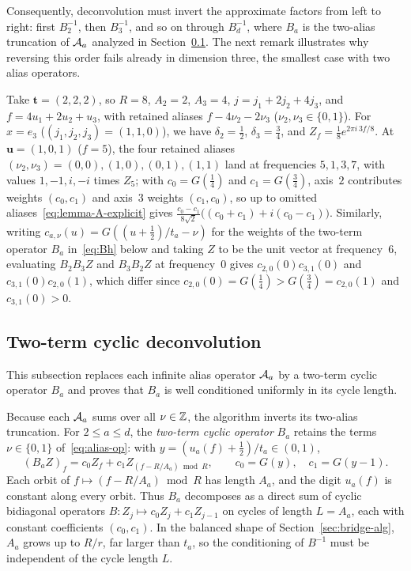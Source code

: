 Consequently, deconvolution must invert the approximate factors from left to right: first $B_2^{-1}$, then $B_3^{-1}$,
and so on through $B_d^{-1}$, where $B_a$ is the two-alias truncation of $\mathcal{A}_a$ analyzed in
Section~\ref{sec:bridge-B}. The next remark illustrates why reversing this order fails already in dimension three, the
smallest case with two alias operators.

\begin{remark}\label{rem:bridge-d3}
Take $\mathbf t=(2,2,2)$, so $R=8$, $A_2=2$, $A_3=4$, $j=j_1+2j_2+4j_3$, and $f=4u_1+2u_2+u_3$, with retained aliases
$f-4\nu_2-2\nu_3$ ($\nu_2,\nu_3\in\{0,1\}$). For $x=e_3$ ($(j_1,j_2,j_3)=(1,1,0)$), we have $\delta_2=\tfrac12$,
$\delta_3=\tfrac34$, and $Z_f=\tfrac18 e^{2\pi i\,3f/8}$. At $\mathbf u=(1,0,1)$ ($f=5$), the four retained aliases
$(\nu_2,\nu_3)=(0,0),(1,0),(0,1),(1,1)$ land at frequencies $5,1,3,7$, with values $1,-1,i,-i$ times $Z_5$; with
$c_0=G(\tfrac14)$ and $c_1=G(\tfrac34)$, axis~$2$ contributes weights $(c_0,c_1)$ and axis~$3$ weights $(c_1,c_0)$, so
up to omitted aliases~\eqref{eq:lemma-A-explicit} gives
$\frac{c_0-c_1}{8\sqrt2}\bigl((c_0+c_1)+i(c_0-c_1)\bigr)$.
Similarly, writing $c_{a,\nu}(u)=G((u+\tfrac12)/t_a-\nu)$ for the weights of the two-term operator $B_a$
in~\eqref{eq:Bh} below and taking $Z$ to be the unit vector at frequency~$6$, evaluating $B_2 B_3 Z$ and $B_3 B_2 Z$ at
frequency~$0$ gives $c_{2,0}(0)c_{3,1}(0)$ and $c_{3,1}(0)c_{2,0}(1)$, which differ since
$c_{2,0}(0)=G(\tfrac14)>G(\tfrac34)=c_{2,0}(1)$ and $c_{3,1}(0)>0$.
\end{remark}

\subsection{Two-term cyclic deconvolution}\label{sec:bridge-B}

This subsection replaces each infinite alias operator $\mathcal{A}_a$ by a two-term cyclic operator $B_a$ and proves that $B_a$
is well conditioned uniformly in its cycle length.

Because each $\mathcal{A}_a$ sums over all $\nu\in\mathbb{Z}$, the algorithm inverts its two-alias truncation. For $2\le a\le d$, the
\emph{two-term cyclic operator} $B_a$ retains the terms $\nu\in\{0,1\}$ of~\eqref{eq:alias-op}: with
$y=(u_a(f)+\tfrac12)/t_a\in(0,1)$,
\begin{equation}\label{eq:Bh}
  (B_a Z)_f=c_0 Z_f+c_1 Z_{(f-R/A_a)\bmod R},\qquad c_0=G(y),\quad c_1=G(y-1).
\end{equation}
Each orbit of $f\mapsto(f-R/A_a)\bmod R$ has length $A_a$, and the digit $u_a(f)$ is constant along every orbit. Thus
$B_a$ decomposes as a direct sum of cyclic bidiagonal operators $B\colon Z_j\mapsto c_0 Z_j+c_1 Z_{j-1}$ on cycles of
length $L=A_a$, each with constant coefficients $(c_0,c_1)$. In the balanced shape of Section~\ref{sec:bridge-alg},
$A_a$ grows up to $R/r$, far larger than $t_a$, so the conditioning of $B^{-1}$ must be independent of the cycle length
$L$.

